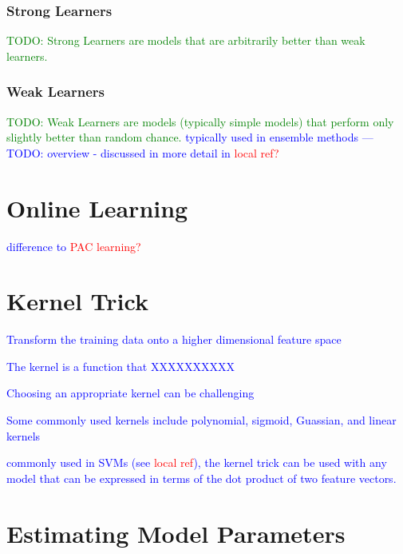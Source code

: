 \subsubsection{Strong Learners}

\textcolor{green}{TODO: Strong Learners are models that are arbitrarily better than weak learners.}

\subsubsection{Weak Learners}

\textcolor{green}{TODO: Weak Learners are models (typically simple models) that perform only slightly better than random chance.} \textcolor{blue}{typically used in ensemble methods --- TODO: overview - discussed in more detail in \textcolor{red}{local ref?}}


\section{Online Learning}

\textcolor{blue}{difference to \textcolor{red}{PAC learning?}}



\section{Kernel Trick}

\textcolor{blue}{Transform the training data onto a higher dimensional feature space}


\textcolor{blue}{The kernel is a function that XXXXXXXXXX}

\textcolor{blue}{Choosing an appropriate kernel can be challenging}

\textcolor{blue}{Some commonly used kernels include polynomial, sigmoid, Guassian, and linear kernels}

\textcolor{blue}{commonly used in SVMs (see \textcolor{red}{local ref}), the kernel trick can be used with any model that can be expressed in terms of the dot product of two feature vectors.}




\section{Estimating Model Parameters}

